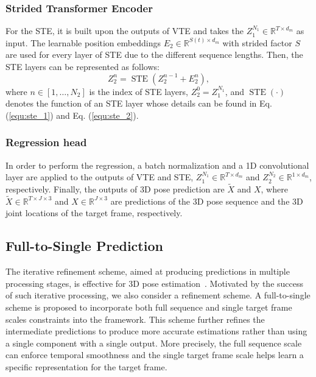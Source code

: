 \documentclass[journal]{IEEEtran}
\begin{document}
\subsubsection{Strided Transformer Encoder}
For the STE, it is built upon the outputs of VTE and takes the $Z_{1}^{N_{1}} \in \mathbb{R}^{T \times d_{m}}$ as input. 
The learnable position embeddings $E_{2} \in \mathbb{R}^{S(t) \times d_{m}}$ with strided factor $S$ are used for every layer of STE due to the different sequence lengths. 
Then, the STE layers can be represented as follows:
\begin{equation}
   Z_{2}^{n} = \operatorname{STE}(Z_{2}^{n-1} + E_{2}^{n}), 
\end{equation}
where $n \in[1, \ldots, N_{2}]$ is the index of STE layers, $Z_{2}^{0} = Z_{1}^{N_{1}}$, and $\operatorname{STE}(\cdot)$ denotes the function of an STE layer whose details can be found in Eq. (\ref{equ:ste_1}) and Eq. (\ref{equ:ste_2}). 

\subsubsection{Regression head}
In order to perform the regression, a batch normalization and a 1D convolutional layer are applied to the outputs of VTE and STE, $Z_{1}^{N_{1}} \in \mathbb{R}^{T \times d_{m}}$ and $Z_{2}^{N_{2}} \in \mathbb{R}^{1 \times d_{m}}$, respectively. 
Finally, the outputs of 3D pose prediction are $\tilde{X}$ and $X$, where $\tilde{X} \in \mathbb{R}^{T \times J \times 3}$ and $X \in \mathbb{R}^{J \times 3}$ are predictions of the 3D pose sequence and the 3D joint locations of the target frame, respectively. 

\subsection{Full-to-Single Prediction}
The iterative refinement scheme, aimed at producing predictions in multiple processing stages, is effective for 3D pose estimation~\cite{pavlakos2017coarse,cai2019exploiting}. 
Motivated by the success of such iterative processing, we also consider a refinement scheme. 
A full-to-single scheme is proposed to incorporate both full sequence and single target frame scales constraints into the framework. 
This scheme further refines the intermediate predictions to produce more accurate estimations rather than using a single component with a single output. 
More precisely, the full sequence scale can enforce temporal smoothness and the single target frame scale helps learn a specific representation for the target frame. 
\end{document}
